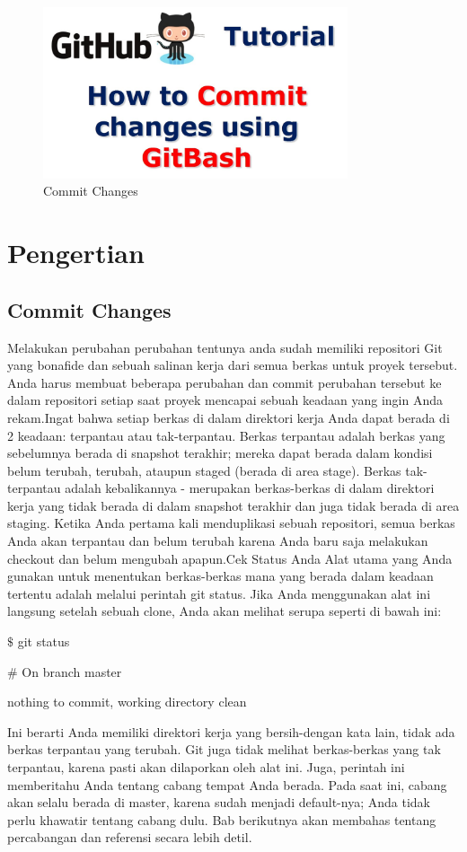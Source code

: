 
\begin{figure}[ht]
	\centerline{\includegraphics[width=0.80\textwidth]{Figures/dapgit1.jpg}}
	\caption{Commit Changes}
	\label{Commit Changes}
\end{figure}


\section {Pengertian }
\subsection {Commit Changes}
Melakukan perubahan perubahan tentunya anda sudah memiliki repositori Git yang bonafide dan sebuah salinan kerja dari semua berkas untuk proyek tersebut. Anda harus membuat beberapa perubahan dan commit perubahan tersebut ke dalam repositori setiap saat proyek mencapai sebuah keadaan yang ingin Anda rekam.Ingat bahwa setiap berkas di dalam direktori kerja Anda dapat berada di 2 keadaan: terpantau atau tak-terpantau. Berkas terpantau adalah berkas yang sebelumnya berada di snapshot terakhir; mereka dapat berada dalam kondisi belum terubah, terubah, ataupun staged (berada di area stage). Berkas tak-terpantau adalah kebalikannya - merupakan berkas-berkas di dalam direktori kerja yang tidak berada di dalam snapshot terakhir dan juga tidak berada di area staging. Ketika Anda pertama kali menduplikasi sebuah repositori, semua berkas Anda akan terpantau dan belum terubah karena Anda baru saja melakukan checkout dan belum mengubah apapun.Cek Status Anda Alat utama yang Anda gunakan untuk menentukan berkas-berkas mana yang berada dalam keadaan tertentu adalah melalui perintah git status. Jika Anda menggunakan alat ini langsung setelah sebuah clone, Anda akan melihat serupa seperti di bawah ini: \par
\noindent 
 $  \$  $ git status \par
\noindent 
 $  \#  $ On branch master \par
\noindent 
nothing to commit, working directory clean \par
\noindent 
Ini berarti Anda memiliki direktori kerja yang bersih-dengan kata lain, tidak ada berkas terpantau yang terubah. Git juga tidak melihat berkas-berkas yang tak terpantau, karena pasti akan dilaporkan oleh alat ini. Juga, perintah ini memberitahu Anda tentang cabang tempat Anda berada. Pada saat ini, cabang akan selalu berada di master, karena sudah menjadi default-nya; Anda tidak perlu khawatir tentang cabang dulu. Bab berikutnya akan membahas tentang percabangan dan referensi secara lebih detil. \par
\noindent 


